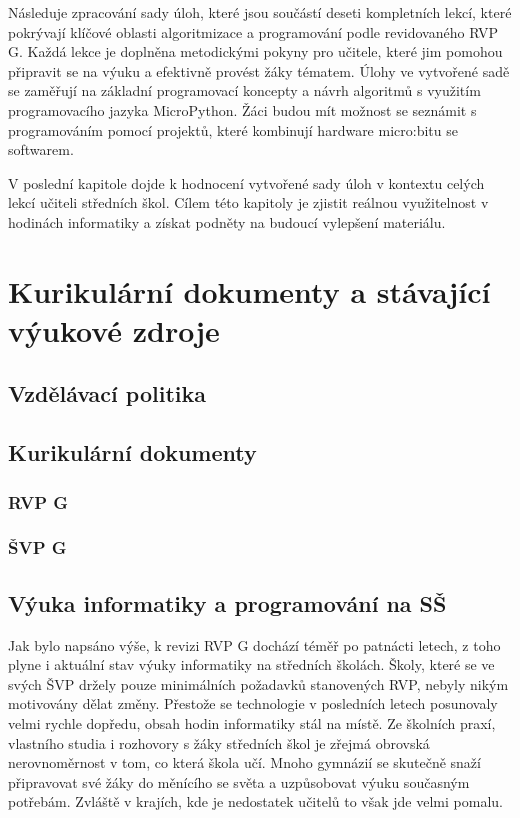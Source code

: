 \documentclass[
  digital,     %
  oneside,     %
  nosansbold,  %
  colorbold, %
  lof,         %
  nolot,         %
]{fithesis4}
\begin{document}
Následuje zpracování sady úloh, které jsou součástí deseti kompletních lekcí, které pokrývají klíčové oblasti algoritmizace a programování podle revidovaného RVP G. Každá lekce je doplněna metodickými pokyny pro učitele, které jim pomohou připravit se na výuku a efektivně provést žáky tématem. Úlohy ve vytvořené sadě se zaměřují na základní programovací koncepty a návrh algoritmů s využitím programovacího jazyka MicroPython. Žáci budou mít možnost se  seznámit s programováním pomocí projektů, které kombinují hardware micro:bitu se softwarem. 

V poslední kapitole dojde k hodnocení vytvořené sady úloh v kontextu celých lekcí učiteli středních škol. Cílem této kapitoly je zjistit reálnou využitelnost v hodinách informatiky a získat podněty na budoucí vylepšení materiálu.

\chapter{Kurikulární dokumenty a stávající výukové zdroje}

\section{Vzdělávací politika}
\section{Kurikulární dokumenty}
\subsection{RVP G}
\subsection{ŠVP G}


\section{Výuka informatiky a programování na SŠ}
Jak bylo napsáno výše, k revizi RVP G dochází téměř po patnácti letech, z toho plyne i aktuální stav výuky informatiky na středních školách. Školy, které se ve svých ŠVP držely pouze minimálních požadavků stanovených RVP, nebyly nikým motivovány dělat změny. Přestože se technologie v posledních letech posunovaly velmi rychle dopředu, obsah hodin informatiky stál na místě. Ze školních praxí, vlastního studia i rozhovory s žáky středních škol je zřejmá obrovská nerovnoměrnost v tom, co která škola učí. Mnoho gymnázií se skutečně snaží připravovat své žáky do měnícího se světa a uzpůsobovat výuku současným potřebám. Zvláště v krajích, kde je nedostatek učitelů to však jde velmi pomalu.
\end{document}

